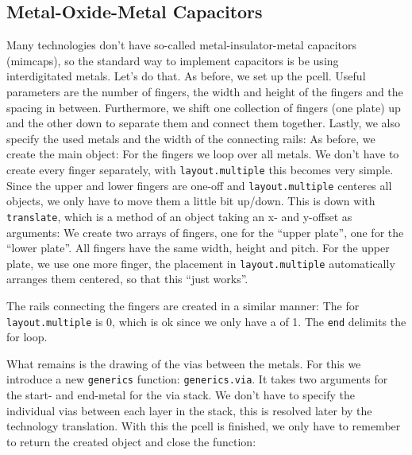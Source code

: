 \subsection{Metal-Oxide-Metal Capacitors}
Many technologies don't have so-called metal-insulator-metal capacitors (mimcaps), so the standard way to implement capacitors is be using interdigitated metals.
Let's do that. As before, we set up the pcell. Useful parameters are the number of fingers, the width and height of the fingers and the spacing in between.
Furthermore, we shift one collection of fingers (one plate) up and the other down to separate them and connect them together. Lastly, we also specify the used
metals and the width of the connecting rails:
As before, we create the main object:
For the fingers we loop over all metals. We don't have to create every finger separately, with \lstinline!layout.multiple! this becomes very simple. Since the upper
and lower fingers are one-off and \lstinline!layout.multiple! centeres all objects, we only have to move them a little bit up/down. This is down with
\lstinline!translate!, which is a method of an object taking an x- and y-offset as arguments:
We create two arrays of fingers, one for the \enquote{upper plate}, one for the \enquote{lower plate}. All fingers have the same width, height and pitch. For the
upper plate, we use one more finger, the placement in \lstinline!layout.multiple! automatically arranges them centered, so that this \enquote{just works}.

The rails connecting the fingers are created in a similar manner:
The  for \lstinline!layout.multiple! is \num{0}, which is ok since we only have a  of \num{1}. The \lstinline!end! delimits the for loop.

What remains is the drawing of the vias between the metals. For this we introduce a new \lstinline!generics! function: \lstinline!generics.via!. It takes two
arguments for the start- and end-metal for the via stack. We don't have to specify the individual vias between each layer in the stack, this is resolved later by the
technology translation.
With this the pcell is finished, we only have to remember to return the created object and close the function:

